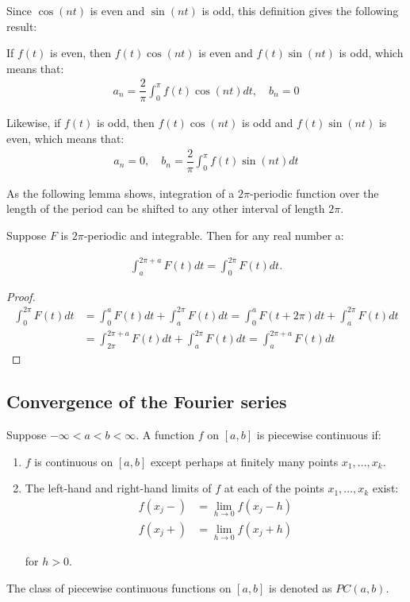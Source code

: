 Since $\cos(nt)$ is even and $\sin(nt)$ is odd, this definition gives the following result:
\begin{lemma}
If $f(t)$ is even, then $f(t)\cos(nt)$ is even and $f(t)\sin(nt)$ is odd, which means that:
\begin{align*}
a_n = \dfrac{2}{\pi} \int_0^\pi f(t) \cos(nt) dt, \quad b_n = 0
\end{align*}

Likewise, if $f(t)$ is odd, then $f(t)\cos(nt)$ is odd and $f(t)\sin(nt)$ is even, which means that:
\begin{align*}
a_n = 0, \quad b_n = \dfrac{2}{\pi} \int_0^\pi f(t) \sin(nt) dt
\end{align*}
\end{lemma}

As the following lemma shows, integration of a $2\pi$-periodic function over the length of the period can be shifted to any other interval of length $2\pi$.

\begin{lemma}\label{lemma:2pi-periodic_function}
Suppose $F$ is $2\pi$-periodic and integrable. Then for any real number a:

\begin{align}
\int_a^{2\pi+a}F(t) dt = \int_0^{2\pi}F(t)dt.
\end{align}
\end{lemma}

\begin{proof}
\begin{align*}
	\int_0^{2\pi} F(t)dt 
	&= \int_0^a F(t) dt + \int_a^{2\pi} F(t) dt
	= \int_0^a F(t+2\pi)dt + \int_a^{2\pi} F(t) dt\\ 
	&= \int_{2\pi}^{2\pi + a} F(t) dt + \int_a^{2\pi}F(t)dt
	= \int_a^{2\pi+a}F(t)dt
\end{align*}
\end{proof}

\subsection{Convergence of the Fourier series}
\begin{definition}
Suppose $-\infty < a < b < \infty$. A function $f$ on $[a,b]$ is piecewise continuous if:
\begin{enumerate}
\item $f$ is continuous on $[a,b]$ except perhaps at finitely many points $x_1, \dots, x_k$.
\item The left-hand and right-hand limits of $f$ at each of the points $x_1, \dots, x_k$ exist:
\begin{align*}
f(x_j-) &= \lim_{h\to 0} f(x_j - h) \\
f(x_j+) &= \lim_{h\to 0} f(x_j + h)
\end{align*}

for $h > 0$.
\end{enumerate}

The class of piecewise continuous functions on $[a,b]$ is denoted as $PC(a,b)$.
\end{definition}


